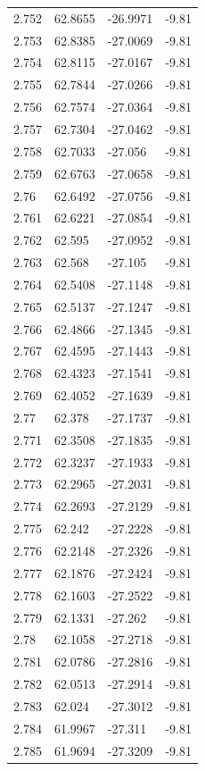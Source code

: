 \begin{tabular}{llll}
2.752 & 62.8655 & -26.9971 & -9.81 \\
2.753 & 62.8385 & -27.0069 & -9.81 \\
2.754 & 62.8115 & -27.0167 & -9.81 \\
2.755 & 62.7844 & -27.0266 & -9.81 \\
2.756 & 62.7574 & -27.0364 & -9.81 \\
2.757 & 62.7304 & -27.0462 & -9.81 \\
2.758 & 62.7033 & -27.056 & -9.81 \\
2.759 & 62.6763 & -27.0658 & -9.81 \\
2.76 & 62.6492 & -27.0756 & -9.81 \\
2.761 & 62.6221 & -27.0854 & -9.81 \\
2.762 & 62.595 & -27.0952 & -9.81 \\
2.763 & 62.568 & -27.105 & -9.81 \\
2.764 & 62.5408 & -27.1148 & -9.81 \\
2.765 & 62.5137 & -27.1247 & -9.81 \\
2.766 & 62.4866 & -27.1345 & -9.81 \\
2.767 & 62.4595 & -27.1443 & -9.81 \\
2.768 & 62.4323 & -27.1541 & -9.81 \\
2.769 & 62.4052 & -27.1639 & -9.81 \\
2.77 & 62.378 & -27.1737 & -9.81 \\
2.771 & 62.3508 & -27.1835 & -9.81 \\
2.772 & 62.3237 & -27.1933 & -9.81 \\
2.773 & 62.2965 & -27.2031 & -9.81 \\
2.774 & 62.2693 & -27.2129 & -9.81 \\
2.775 & 62.242 & -27.2228 & -9.81 \\
2.776 & 62.2148 & -27.2326 & -9.81 \\
2.777 & 62.1876 & -27.2424 & -9.81 \\
2.778 & 62.1603 & -27.2522 & -9.81 \\
2.779 & 62.1331 & -27.262 & -9.81 \\
2.78 & 62.1058 & -27.2718 & -9.81 \\
2.781 & 62.0786 & -27.2816 & -9.81 \\
2.782 & 62.0513 & -27.2914 & -9.81 \\
2.783 & 62.024 & -27.3012 & -9.81 \\
2.784 & 61.9967 & -27.311 & -9.81 \\
2.785 & 61.9694 & -27.3209 & -9.81 \\

\end{tabular}
